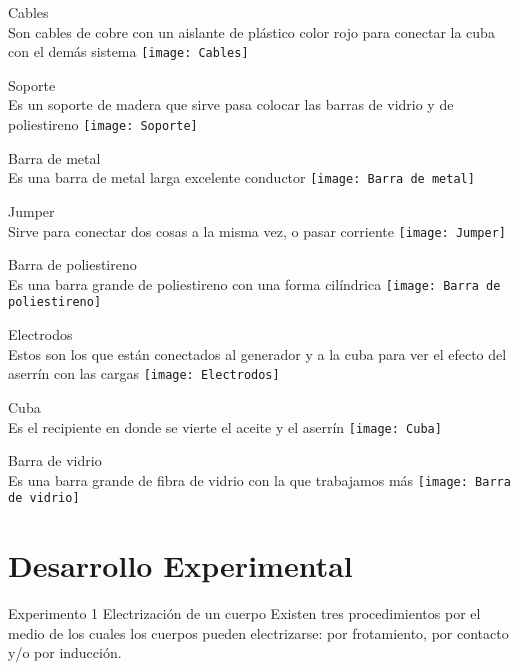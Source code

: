 \documentclass[14pt]{article}
\begin{document}
\begin{multicols}{2}
Cables\\ 
Son cables de cobre con un aislante de plástico color rojo para conectar la cuba con el demás sistema 
\texttt{[image: Cables]}

Soporte \\
Es un soporte de madera que sirve pasa colocar las barras de vidrio y de poliestireno 
\texttt{[image: Soporte]}

Barra de metal \\
Es una barra de metal larga excelente conductor 
\texttt{[image: Barra de metal]}

Jumper \\
Sirve para conectar dos cosas a la misma vez, o pasar corriente 
\texttt{[image: Jumper]}

Barra de poliestireno \\
Es una barra grande de poliestireno con una forma cilíndrica 
\texttt{[image: Barra de poliestireno]}

Electrodos \\
Estos son los que están conectados al generador y a la cuba para ver el efecto del aserrín con las cargas  
\texttt{[image: Electrodos]}

Cuba \\
Es el recipiente en donde se vierte el aceite y el aserrín  
\texttt{[image: Cuba]}

Barra de vidrio \\
Es una barra grande de fibra de vidrio con la que trabajamos más 
\texttt{[image: Barra de vidrio]}

	\section{Desarrollo Experimental}
	Experimento 1 Electrización de un cuerpo
	Existen tres procedimientos por el medio de los cuales los cuerpos pueden electrizarse: por frotamiento, por contacto y/o por inducción. 


\end{multicols}
\end{document}
